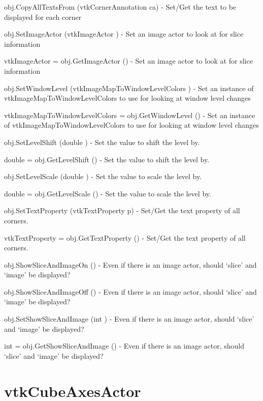 \begin{DoxyItemize}
\item {\ttfamily obj.\-Copy\-All\-Texts\-From (vtk\-Corner\-Annotation ca)} -\/ Set/\-Get the text to be displayed for each corner  
\item {\ttfamily obj.\-Set\-Image\-Actor (vtk\-Image\-Actor )} -\/ Set an image actor to look at for slice information  
\item {\ttfamily vtk\-Image\-Actor = obj.\-Get\-Image\-Actor ()} -\/ Set an image actor to look at for slice information  
\item {\ttfamily obj.\-Set\-Window\-Level (vtk\-Image\-Map\-To\-Window\-Level\-Colors )} -\/ Set an instance of vtk\-Image\-Map\-To\-Window\-Level\-Colors to use for looking at window level changes  
\item {\ttfamily vtk\-Image\-Map\-To\-Window\-Level\-Colors = obj.\-Get\-Window\-Level ()} -\/ Set an instance of vtk\-Image\-Map\-To\-Window\-Level\-Colors to use for looking at window level changes  
\item {\ttfamily obj.\-Set\-Level\-Shift (double )} -\/ Set the value to shift the level by.  
\item {\ttfamily double = obj.\-Get\-Level\-Shift ()} -\/ Set the value to shift the level by.  
\item {\ttfamily obj.\-Set\-Level\-Scale (double )} -\/ Set the value to scale the level by.  
\item {\ttfamily double = obj.\-Get\-Level\-Scale ()} -\/ Set the value to scale the level by.  
\item {\ttfamily obj.\-Set\-Text\-Property (vtk\-Text\-Property p)} -\/ Set/\-Get the text property of all corners.  
\item {\ttfamily vtk\-Text\-Property = obj.\-Get\-Text\-Property ()} -\/ Set/\-Get the text property of all corners.  
\item {\ttfamily obj.\-Show\-Slice\-And\-Image\-On ()} -\/ Even if there is an image actor, should `slice' and `image' be displayed?  
\item {\ttfamily obj.\-Show\-Slice\-And\-Image\-Off ()} -\/ Even if there is an image actor, should `slice' and `image' be displayed?  
\item {\ttfamily obj.\-Set\-Show\-Slice\-And\-Image (int )} -\/ Even if there is an image actor, should `slice' and `image' be displayed?  
\item {\ttfamily int = obj.\-Get\-Show\-Slice\-And\-Image ()} -\/ Even if there is an image actor, should `slice' and `image' be displayed?  
\end{DoxyItemize}\hypertarget{vtkhybrid_vtkcubeaxesactor}{}\section{vtk\-Cube\-Axes\-Actor}\label{vtkhybrid_vtkcubeaxesactor}

